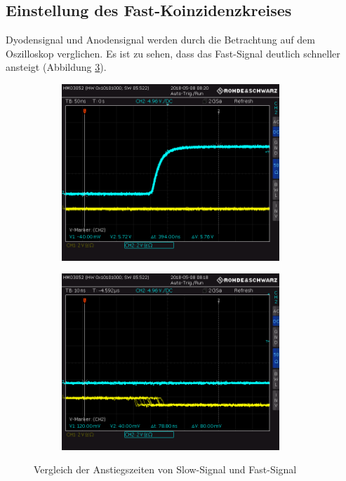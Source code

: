 \subsection{Einstellung des Fast-Koinzidenzkreises}
Dyodensignal und Anodensignal werden durch die Betrachtung auf dem Oszilloskop verglichen. Es ist zu sehen, dass das Fast-Signal deutlich schneller ansteigt (Abbildung \ref{fig:slow_fast}). \newpage
\begin{figure}[h]
  \centering
  \begin{subfigure}[h]{0.5\textwidth}
    \centering
    \includegraphics[width=0.9\textwidth]{data/oszi/anstiegszeit_slow.PNG}
    \label{fig:anstiegszeit_slow}
  \end{subfigure}%
  \begin{subfigure}[h]{0.5\textwidth}
    \centering
    \includegraphics[width=0.9\textwidth]{data/oszi/anstiegszeit_fast.PNG}
    \label{fig:anstiegszeit_fast}
  \end{subfigure}
  \caption{Vergleich der Anstiegszeiten von Slow-Signal und Fast-Signal}
  \label{fig:slow_fast}
\end{figure}

